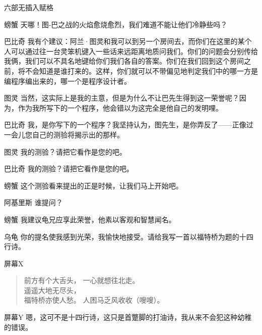 \begin{dialog}{六部无插入赋格}
\begin{dialogue}
\item[螃蟹]天哪！图-巴之战的火焰愈烧愈烈，我们难道不能让他们冷静些吗？

\item[巴比奇]我有个建议：阿兰·图灵和我可以到另一个房间去，而你们在这里的某个人可以通过往一台灵笨机键入一些话来远距离地质问我们。你们的问题会分别传给我俩，我们可以不具名地键给你们我们各自的答案。你们在我们回到这个房间之前，将不会知道是谁打来的。这样，你们就可以不带偏见地判定我们中的哪一方是编程序编出来的，哪一个是程序设计者。

\item[图灵]当然，这实际上是我的主意，但是为什么不让巴先生得到这一荣誉呢？因为，作为我所写下的一个程序，他会错以为这完全是他自己的发明哩。

\item[巴比奇]我，是你写下的一个程序？我坚持认为，图先生，是你弄反了——正像过一会儿您自己的测验将揭示出的那样。

\item[图灵]我的测验？请把它看作是您的吧。

\item[巴比奇]我的测验？请把它看作是您的吧。

\item[螃蟹]这个测验看来提出的正是时候，让我们马上开始吧。


\item[阿基里斯]谁提问？

\item[螃蟹]我建议龟兄应享此荣誉，他素以客观和智慧闻名。

\item[乌龟]你的提名使我感到光荣，我愉快地接受。请给我写一首以福特桥为题的十四行诗。


\item[屏幕X]
\begin{verse}
前方有个大舌头，
一心就想往北走。\\[1]
遥遥大地无尽头，\\[1]
福特桥亦使人愁。
人困马乏风收收（嗖嗖）。
\end{verse}
\item[屏幕Y]嗯，这可不是十四行诗，这只是首蹩脚的打油诗，我从来不会犯这种幼稚的错误。


\end{dialogue}
\end{dialog}
